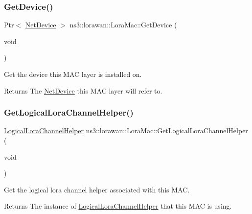 \subsubsection{\texorpdfstring{Get\+Device()}{GetDevice()}}
{\footnotesize\ttfamily Ptr$<$ \hyperlink{classNetDevice}{Net\+Device} $>$ ns3\+::lorawan\+::\+Lora\+Mac\+::\+Get\+Device (\begin{DoxyParamCaption}\item[{void}]{ }\end{DoxyParamCaption})}

Get the device this M\+AC layer is installed on.

\begin{DoxyReturn}{Returns}
The \hyperlink{classNetDevice}{Net\+Device} this M\+AC layer will refer to. 
\end{DoxyReturn}
\mbox{\label{classns3_1_1lorawan_1_1LoraMac_a1f2ade596a55c0baa9a0252f5b7d04a7}} 
\subsubsection{\texorpdfstring{Get\+Logical\+Lora\+Channel\+Helper()}{GetLogicalLoraChannelHelper()}}
{\footnotesize\ttfamily \hyperlink{classns3_1_1lorawan_1_1LogicalLoraChannelHelper}{Logical\+Lora\+Channel\+Helper} ns3\+::lorawan\+::\+Lora\+Mac\+::\+Get\+Logical\+Lora\+Channel\+Helper (\begin{DoxyParamCaption}\item[{void}]{ }\end{DoxyParamCaption})}

Get the logical lora channel helper associated with this M\+AC.

\begin{DoxyReturn}{Returns}
The instance of \hyperlink{classns3_1_1lorawan_1_1LogicalLoraChannelHelper}{Logical\+Lora\+Channel\+Helper} that this M\+AC is using. 
\end{DoxyReturn}
\mbox{\label{classns3_1_1lorawan_1_1LoraMac_a8c731405d8a33467119060a3669b4105}} 
